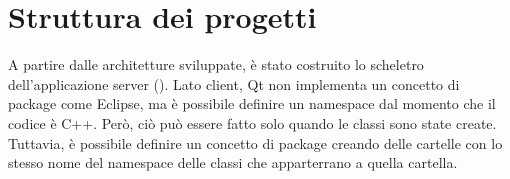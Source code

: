 \section{Struttura dei progetti}
A partire dalle architetture sviluppate, è stato costruito lo scheletro dell'applicazione server (). Lato client, Qt non implementa un concetto di package come Eclipse, ma è possibile definire un namespace dal momento che il codice è C++. Però, ciò può essere fatto solo quando le classi sono state create. Tuttavia, è possibile definire un concetto di package creando delle cartelle con lo stesso nome del namespace delle classi che apparterrano a quella cartella.
